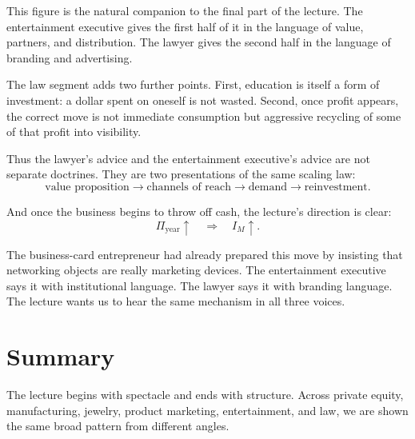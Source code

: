 \begin{figure}
\centering
{}
\end{figure}

This figure is the natural companion to the final part of the lecture. The entertainment executive gives the first half of it in the language of value, partners, and distribution. The lawyer gives the second half in the language of branding and advertising.

The law segment adds two further points. First, education is itself a form of investment: a dollar spent on oneself is not wasted. Second, once profit appears, the correct move is not immediate consumption but aggressive recycling of some of that profit into visibility.

Thus the lawyer's advice and the entertainment executive's advice are not separate doctrines. They are two presentations of the same scaling law:
\begin{equation}
\mbox{value proposition} \longrightarrow \mbox{channels of reach} \longrightarrow \mbox{demand} \longrightarrow \mbox{reinvestment}.
\end{equation}

And once the business begins to throw off cash, the lecture's direction is clear:
\begin{equation}
\Pi_{\mathrm{year}} \uparrow \quad \Rightarrow \quad I_M \uparrow.
\end{equation}

The business-card entrepreneur had already prepared this move by insisting that networking objects are really marketing devices. The entertainment executive says it with institutional language. The lawyer says it with branding language. The lecture wants us to hear the same mechanism in all three voices.

\section{Summary}

The lecture begins with spectacle and ends with structure. Across private equity, manufacturing, jewelry, product marketing, entertainment, and law, we are shown the same broad pattern from different angles.

